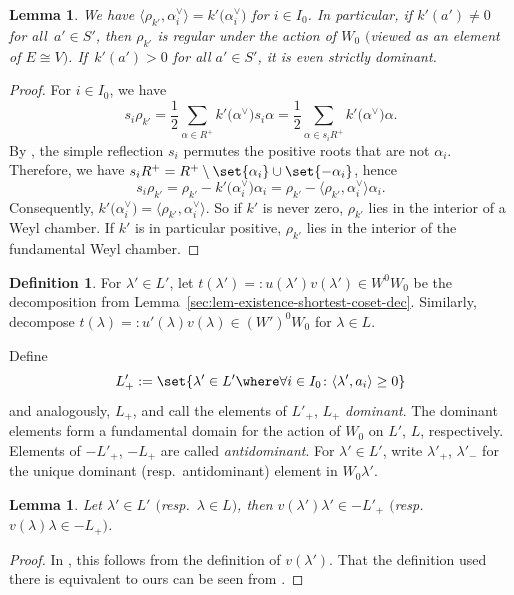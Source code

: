 \documentclass[pdftex]{sigma}
\newtheorem{Lemma}[Theorem]{Lemma}
\theoremstyle{definition}
\newtheorem{Definition}[Theorem]{Definition}
\numberwithin{equation}{section}
\begin{document}
\begin{Lemma}\label{sec:lem-rho-inner-prod}
 We have $\big\langle\rho_{k'},\alpha_i^\vee\big\rangle=k'\bigl(\alpha_i^\vee\bigr)$
 for $i\in I_0$. In particular,
 if $k'(a')\ne0$ for all~${a'\in S'}$, then $\rho_{k'}$ is regular under
 the action of $W_0$ $($viewed as an element of $E\cong V)$. If~${k'(a')>0}$ for all
 $a'\in S'$, it is even strictly dominant.
\end{Lemma}
\begin{proof}
 For $i\in I_0$, we have
 \[
 s_i \rho_{k'} = \frac{1}{2}\sum_{\alpha\in R^+} k'\bigl(\alpha^\vee\bigr)s_i\alpha
 = \frac{1}{2}\sum_{\alpha\in s_iR^+} k'\bigl(\alpha^\vee\bigr)\alpha.
 \]
 By \cite[Chapitre~VI, Section~1.6, Corollaire~1]{bourbaki}, the simple reflection $s_i$
 permutes the positive roots that are not $\alpha_i$. Therefore,
 we have $s_i R^+ = R^+\setminus\set{\alpha_i}\cup\set{-\alpha_i}$, hence
 \[
 s_i \rho_{k'} = \rho_{k'} - k'\bigl(\alpha_i^\vee\bigr) \alpha_i
 = \rho_{k'} - \big\langle \rho_{k'}, \alpha_i^\vee\big\rangle \alpha_i.
 \]
 Consequently, $k'\bigl(\alpha_i^\vee\bigr)=\langle\rho_{k'},\alpha_i^\vee\rangle$. So if
 $k'$ is never zero, $\rho_{k'}$ lies in the interior of a Weyl chamber. If $k'$
 is in particular positive, $\rho_{k'}$ lies in the interior of the fundamental
 Weyl chamber.
\end{proof}

\begin{Definition}
 For $\lambda'\in L'$, let $t(\lambda') =: u(\lambda')v(\lambda')\in W^0W_0$ be the decomposition from Lemma~\ref{sec:lem-existence-shortest-coset-dec}. Similarly, decompose $t(\lambda) =: u'(\lambda)v(\lambda)\in (W')^0W_0$
 for $\lambda\in L$.
\end{Definition}

 Define
 \[
 L'_+:=\set{\lambda'\in L'\where\forall i\in I_0\colon \langle\lambda',a_i\rangle\ge0}
 \]
 and analogously, $L_+$, and call the elements of $L'_+$, $L_+$ \emph{dominant}. The dominant elements form a fundamental domain for
 the action of $W_0$ on $L'$, $L$, respectively. Elements of $-L'_+$, $-L_+$ are called
 \emph{antidominant}. For $\lambda'\in L'$, write $\lambda'_+$, $\lambda'_-$
 for the unique dominant (resp.\ antidominant) element in $W_0\lambda'$.

\begin{Lemma}\label{sec:lem-v-antidominant}
 Let $\lambda'\in L'$ $($resp.\ $\lambda\in L)$, then $v(\lambda')\lambda'\in -L'_+$
$($resp.\ $v(\lambda)\lambda\in -L_+)$.
\end{Lemma}
\begin{proof}
 In \cite[Section~2.4]{macdonald}, this follows from the definition of $v(\lambda')$. That the definition used there is equivalent to ours can be seen
 from \cite[Section~2.4.9]{macdonald}.
\end{proof}
\end{document}
